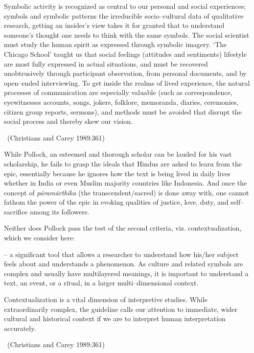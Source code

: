 \begin{myquote}
Symbolic activity is recognized as central to our personal and social experiences; symbols and symbolic patterns the irreducible socio–cultural data of qualitative research, getting an insider’s view takes it for granted that to understand someone’s thought one needs to think with the same symbols. The social scientist must study the human spirit as expressed through symbolic imagery. ‘The Chicago School’ taught us that social feelings (attitudes and sentiments) lifestyle are most fully expressed in actual situations, and must be recovered unobtrusively through participant observation, from personal documents, and by open–ended interviewing. To get inside the realms of lived experience, the natural processes of communication are especially valuable (such as correspondence, eyewitnesses accounts, songs, jokers, folklore, memoranda, diaries, ceremonies, citizen group reports, sermons), and methods must be avoided that disrupt the social process and thereby skew our vision. 

~\hfill (Christians and Carey 1989:361)
\end{myquote}

While Pollock, an esteemed and thorough scholar can be lauded for his vast scholarship, he fails to grasp the ideals that Hindus are asked to learn from the epic, essentially because he ignores how the text is being lived in daily lives whether in India or even Muslim majority countries like Indonesia. And once the concept of \textit{pāramārthika} (the transcendent/sacred) is done away with, one cannot fathom the power of the epic in evoking qualities of justice, love, duty, and self–sacrifice among its followers.

Neither does Pollock pass the test of the second criteria, viz. contextualization, which we consider here:

\begin{myquote}
– a significant tool that allows a researcher to understand how his/her subject feels about and understands a phenomenon. As culture and related symbols are complex and usually have multilayered meanings, it is important to understand a text, an event, or a ritual, in a larger multi–dimensional context.
\end{myquote}

\begin{myquote}
Contextualization is a vital dimension of interpretive studies. While extraordinarily complex, the guideline calls our attention to immediate, wider cultural and historical context if we are to interpret human interpretation accurately. 

~\hfill (Christians and Carey 1989:361)
\end{myquote}

